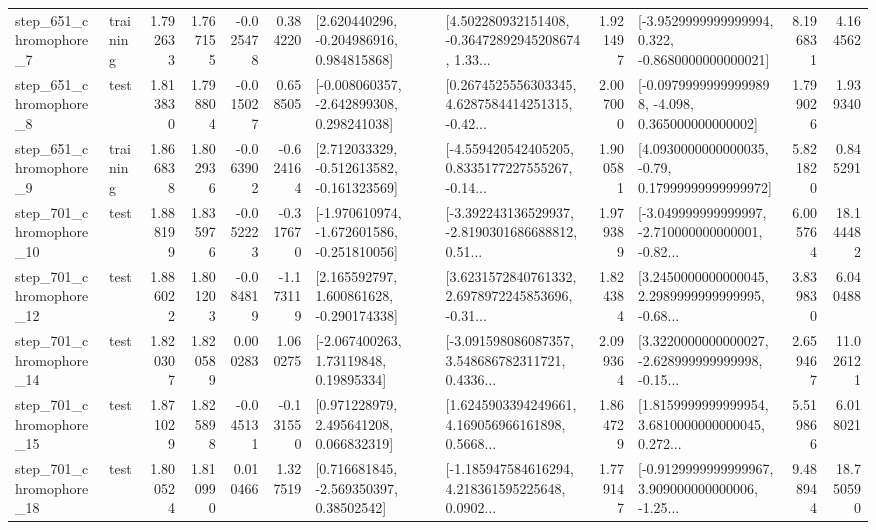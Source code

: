 \begin{tabular}{llrrrrllrlrr}
   step\_651\_chromophore\_7 &  training &      1.792633 &    1.767155 &     -0.025478 &  0.384220 &    [2.620440296, -0.204986916, 0.984815868] &  [4.502280932151408, -0.36472892945208674, 1.33... &       1.921497 &  [-3.9529999999999994, 0.322, -0.8680000000000021] &            8.196831 &          4.164562 \\
   step\_651\_chromophore\_8 &      test &      1.813830 &    1.798804 &     -0.015027 &  0.658505 &   [-0.008060357, -2.642899308, 0.298241038] &  [0.2674525556303345, 4.6287584414251315, -0.42... &       2.007000 &  [-0.09799999999999898, -4.098, 0.365000000000002] &            1.799026 &          1.939340 \\
   step\_651\_chromophore\_9 &  training &      1.866838 &    1.802936 &     -0.063902 & -0.624164 &   [2.712033329, -0.512613582, -0.161323569] &  [-4.559420542405205, 0.8335177227555267, -0.14... &       1.900581 &   [4.0930000000000035, -0.79, 0.17999999999999972] &            5.821820 &          0.845291 \\
  step\_701\_chromophore\_10 &      test &      1.888199 &    1.835976 &     -0.052223 & -0.317670 &  [-1.970610974, -1.672601586, -0.251810056] &  [-3.392243136529937, -2.8190301686688812, 0.51... &       1.979389 &  [-3.049999999999997, -2.710000000000001, -0.82... &            6.005764 &         18.144482 \\
  step\_701\_chromophore\_12 &      test &      1.886022 &    1.801203 &     -0.084819 & -1.173119 &    [2.165592797, 1.600861628, -0.290174338] &  [3.6231572840761332, 2.6978972245853696, -0.31... &       1.824384 &  [3.2450000000000045, 2.2989999999999995, -0.68... &            3.839830 &          6.040488 \\
  step\_701\_chromophore\_14 &      test &      1.820307 &    1.820589 &      0.000283 &  1.060275 &      [-2.067400263, 1.73119848, 0.19895334] &  [-3.091598086087357, 3.548686782311721, 0.4336... &       2.099364 &  [3.3220000000000027, -2.628999999999998, -0.15... &            2.659467 &         11.026121 \\
  step\_701\_chromophore\_15 &      test &      1.871029 &    1.825898 &     -0.045131 & -0.131550 &     [0.971228979, 2.495641208, 0.066832319] &  [1.6245903394249661, 4.169056966161898, 0.5668... &       1.864729 &  [1.8159999999999954, 3.6810000000000045, 0.272... &            5.519866 &          6.018021 \\
  step\_701\_chromophore\_18 &      test &      1.800524 &    1.810990 &      0.010466 &  1.327519 &     [0.716681845, -2.569350397, 0.38502542] &  [-1.185947584616294, 4.218361595225648, 0.0902... &       1.779147 &  [-0.9129999999999967, 3.909000000000006, -1.25... &            9.488944 &         18.750590 \\

\end{tabular}
